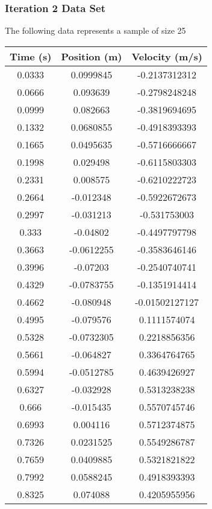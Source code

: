 \documentclass{report}
\begin{document}
    \bigbreak \noindent 
    \subsubsection{Iteration 2 Data Set}
    \bigbreak \noindent 
    The following data represents a sample of size 25
    \bigbreak \noindent 
    \begin{center}
        \begin{tabular}{c|c|c}
            Time (s) & Position (m) & Velocity (m/s) \\
            \hline
            0.0333	&0.0999845	&-0.2137312312\\
            0.0666	&0.093639	&-0.2798248248\\
            0.0999	&0.082663	&-0.3819694695\\
            0.1332	&0.0680855	&-0.4918393393\\
            0.1665	&0.0495635	&-0.5716666667\\
            0.1998	&0.029498	&-0.6115803303\\
            0.2331	&0.008575	&-0.6210222723\\
            0.2664	&-0.012348	&-0.5922672673\\
            0.2997	&-0.031213	&-0.531753003\\
            0.333	&-0.04802	&-0.4497797798\\
            0.3663	&-0.0612255	&-0.3583646146\\
            0.3996	&-0.07203	&-0.2540740741\\
            0.4329	&-0.0783755	&-0.1351914414\\
            0.4662	&-0.080948	&-0.01502127127\\
            0.4995	&-0.079576	&0.1111574074\\
            0.5328	&-0.0732305	&0.2218856356\\
            0.5661	&-0.064827	&0.3364764765\\
            0.5994	&-0.0512785	&0.4639426927\\
            0.6327	&-0.032928	&0.5313238238\\
            0.666	&-0.015435	&0.5570745746\\
            0.6993	&0.004116	&0.5712374875\\
            0.7326	&0.0231525	&0.5549286787\\
            0.7659	&0.0409885	&0.5321821822\\
            0.7992	&0.0588245	&0.4918393393\\
            0.8325	&0.074088	&0.4205955956
        \end{tabular}
    \end{center}
\end{document}
